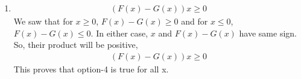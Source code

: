 \documentclass[journal,12pt,twocolumn]{IEEEtran}
\begin{document}
\begin{enumerate}
\newpage

    \item \begin{align}
              (F(x)-G(x))x \geq 0
          \end{align}
           We saw that for $x \geq 0$, $F(x)-G(x) \geq 0$ and for $x \leq 0$, $F(x)-G(x) \leq 0$.
          In either case, $x$ and $F(x)-G(x)$ have same sign.
          So, their product will be positive,
          \begin{align}
              (F(x)-G(x))x \geq 0
          \end{align}
          This proves that option-4 is true for all x.
\end{enumerate}
\end{document}
